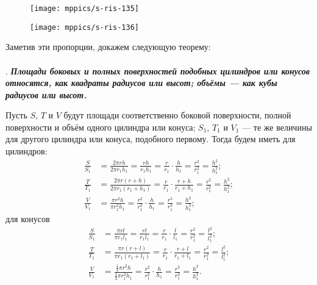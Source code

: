 \begin{figure}[h!]
\begin{minipage}{.48\textwidth}
\centering
\texttt{[image: mppics/s-ris-135]}
\end{minipage}\hfill
\begin{minipage}{.48\textwidth}
\centering
\texttt{[image: mppics/s-ris-136]}
\end{minipage}

\medskip

\begin{minipage}{.48\textwidth}
\centering
\caption{}\label{1938/s-ris-135}
\end{minipage}\hfill
\begin{minipage}{.48\textwidth}
\centering
\caption{}\label{1938/s-ris-136}
\end{minipage}
\vskip-4mm
\end{figure}

Заметив эти пропорции, докажем следующую теорему:

\paragraph{}\label{1938/s124}
.
\textbf{\emph{Площади боковых и полных поверхностей подобных цилиндров или конусов относятся, как квадраты радиусов или высот;
объёмы — как кубы радиусов или высот.}}

Пусть $S$, $T$ и $V$ будут площади соответственно боковой поверхности, полной поверхности и объём одного цилиндра или конуса;
$S_1$, $T_1$ и $V_1$ — те же величины для другого цилиндра или конуса, подобного первому.
Тогда будем иметь для цилиндров:
\begin{align*}
\frac S{S_1}&=
\frac{2\pi rh}{2\pi r_1h_1}=
\frac{rh}{r_1h_1}=
\frac{r}{r_1}\cdot \frac{h}{h_1}=
\frac{r^2}{r_1^2}=
\frac{h^2}{h_1^2};
\\
\frac T{T_1}&=
\frac{2\pi r(r+h)}{2\pi r_1(r_1+h_1)}=
\frac{r}{r_1}\cdot\frac{r+h}{r_1+h_1}=
\frac{r^2}{r_1^2}=
\frac{h^2}{h_1^2};
\\
\frac V{V_1}&=
\frac{\pi r^2h}{\pi r_1^2h_1}=
\frac{r^2}{r_1^2}\cdot \frac{h}{h_1}=
\frac{r^3}{r_1^3}=
\frac{h^3}{h_1^3};
\end{align*}
для конусов
\begin{align*}
\frac S{S_1}&=
\frac{\pi rl}{\pi r_1l_1}=
\frac{rl}{r_1l_1}=
\frac{r}{r_1}\cdot \frac{l}{l_1}=
\frac{r^2}{r_1^2}=
\frac{l^2}{l_1^2};
\\
\frac T{T_1}&=
\frac{\pi r(r+l)}{\pi r_1(r_1+l_1)}=
\frac{r}{r_1}\cdot\frac{r+l}{r_1+l_1}=
\frac{r^2}{r_1^2}=
\frac{l^2}{l_1^2};
\\
\frac V{V_1}&=
\frac{\frac13\pi r^2h}{\frac13\pi r_1^2h_1}=
\frac{r^2}{r_1^2}\cdot \frac{h}{h_1}=
\frac{r^3}{r_1^3}=
\frac{h^3}{h_1^3}.
\end{align*}

